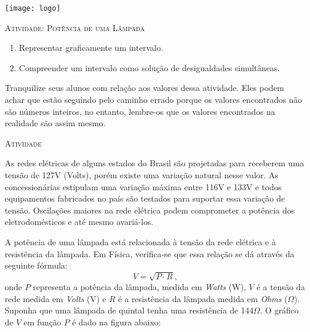 \documentclass[10 pt,usenames,dvipsnames, oneside]{article}
\begin{document}
\begin{center}
  \begin{minipage}[l]{3cm}
\texttt{[image: logo]}    
\end{minipage}\hfill
\begin{minipage}[r]{.8\textwidth}
 {\Large \scshape Atividade: Potência de uma Lâmpada}  
\end{minipage}
\end{center}
\vspace{.2cm}

\ifdefined\prof

\begin{goals}
\begin{enumerate}
\item Representar graficamente um intervalo.
\item Compreender um intervalo como solução de desigualdades simultâneas.
\end{enumerate}

\tcblower

Tranquilize seus alunos com relação aos valores dessa atividade. Eles podem achar que estão seguindo pelo caminho errado porque os valores encontrados não são números inteiros, no entanto, lembre-os que os valores encontrados na realidade são assim mesmo.
\end{goals}

\bigskip
\begin{center}
{\large \scshape Atividade}
\end{center}
\fi

As redes elétricas de alguns estados do Brasil são projetadas para receberem uma tensão de 127V (Volts), porém existe uma variação natural nesse valor. As concessionárias estipulam uma variação máxima entre 116V e 133V e todos equipamentos fabricados no país são testados para suportar essa variação de tensão. Oscilações maiores na rede elétrica podem comprometer a potência dos eletrodomésticos e até mesmo avariá-los.

A potência de uma lâmpada está relacionada à tensão da rede elétrica e à resistência da lâmpada. Em Física, verifica-se que essa relação se dá através da seguinte fórmula:
$$
V = \sqrt{P\cdot R},
$$
onde $P$ representa a potência da lâmpada, medida em \emph{Watts} (W), $V$ é a tensão da rede medida em \emph{Volts} (V) e $R$ é a resistência da lâmpada medida em \emph{Ohms} ($\Omega$). Suponha que uma lâmpada de quintal tenha uma resistência de 144$\Omega$. O gráfico de $V$ em função $P$ é dado na figura abaixo: 
\end{document}
